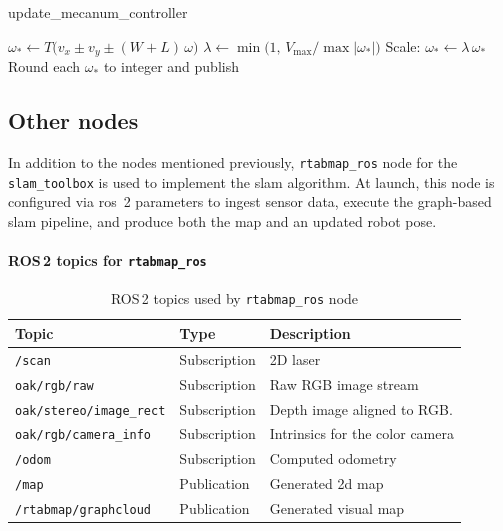 \begin{algorithm}[H]
  \caption{update\_mecanum\_controller}
  \begin{algorithmic}[1]
    \State $\omega_{*} \gets T\bigl(v_x \pm v_y \pm (W+L)\,\omega\bigr)$
    \State $\lambda \gets \min\bigl(1,\,V_{\max}/\max|\omega_*|\bigr)$
    \State Scale: $\omega_* \gets \lambda\,\omega_*$
    \State Round each $\omega_*$ to integer and publish
    \EndFunction
  \end{algorithmic}
\end{algorithm}

\subsection{Other nodes}

In addition to the nodes mentioned previously, \texttt{rtabmap\_ros} node for the \texttt{slam\_toolbox} is used to implement the \gls{slam} algorithm. At launch, this node is configured via \gls{ros}~2 parameters to ingest sensor data, execute the graph-based \gls{slam} pipeline, and produce both the map and an updated robot pose.

\paragraph*{ROS\,2 topics for \texttt{rtabmap\_ros}}
\begin{table}[H]
  \centering
  \begin{tabular}{lll}
    \toprule
    \textbf{Topic}                  & \textbf{Type} & \textbf{Description}            \\
    \midrule
    \texttt{/scan}                  & Subscription  & 2D laser                        \\
    \texttt{oak/rgb/raw}            & Subscription  & Raw RGB image stream            \\
    \texttt{oak/stereo/image\_rect} & Subscription  & Depth image aligned to RGB.    \\
    \texttt{oak/rgb/camera\_info}   & Subscription  & Intrinsics for the color camera \\
    \texttt{/odom}                  & Subscription  & Computed odometry               \\
    \texttt{/map}                   & Publication   & Generated 2d map                \\
    \texttt{/rtabmap/graphcloud}   & Publication   & Generated visual map            \\
    \bottomrule
  \end{tabular}
  \caption{ROS\,2 topics used by \texttt{rtabmap\_ros} node}
  \label{tab:rtabmap-topics}
\end{table}


